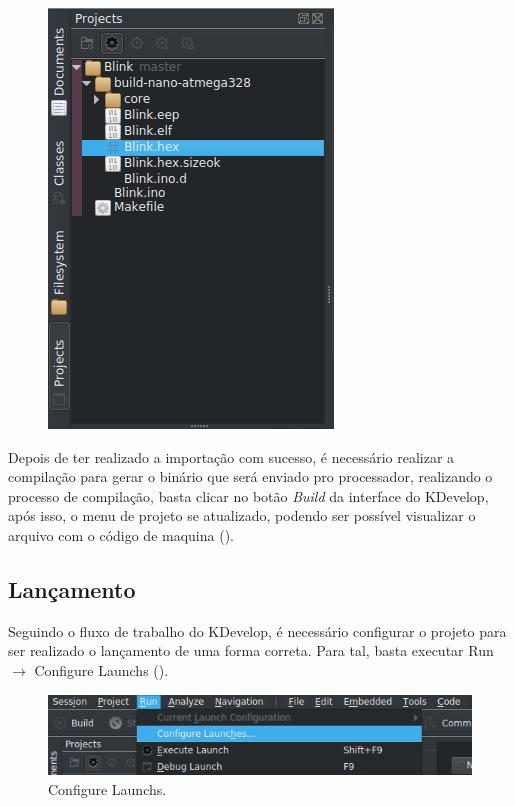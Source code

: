\begin{figure}[!htb]
\begin{minipage}[t]{0.5\textwidth}
  \includegraphics[width=0.713\linewidth]{figuras/projects2.png}
  \label{fig:projects2}
  \end{minipage}
\end{figure}

Depois de ter realizado a importação com sucesso, é necessário realizar a compilação para gerar o binário que será enviado pro processador, realizando o processo de compilação, basta clicar no botão \textit{Build} da interface do KDevelop, após isso, o menu de projeto se atualizado, podendo ser possível visualizar o arquivo com o código de maquina ().

\subsection{Lançamento}

Seguindo o fluxo de trabalho do KDevelop, é necessário configurar o projeto para ser realizado o lançamento de uma forma correta. Para tal, basta executar Run $\rightarrow$ Configure Launchs ().

\begin{figure}[!htb]
  \centering
  \caption[Configure Launchs]{Configure Launchs.}
  \label{fig:run}
  \includegraphics[width=1\textwidth]{figuras/run.png}
\end{figure}

